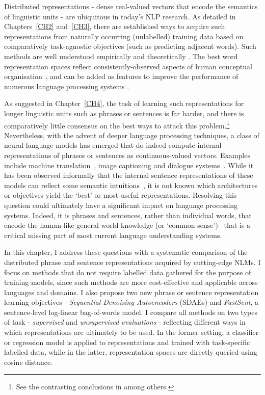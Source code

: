 \label{CH5}

Distributed representations - dense real-valued vectors that encode the semantics of linguistic units - are ubiquitous in today's NLP research. As detailed in Chapters~\ref{CH2} and~\ref{CH3}, there are established ways to acquire such representations from naturally occurring (unlabelled) training data based on comparatively task-agnostic objectives (such as predicting adjacent words). Such methods are well understood empirically \citep{baroni2014don} and theoretically \citep{levy2014neural}. The best word representation spaces reflect consistently-observed aspects of human conceptual organisation~\citep{hill2014simlex}, and can be added as features to improve the performance of numerous language processing systems \citep{collobert2011natural}. 

As suggested in Chapter~\ref{CH4}, the task of learning such representations for longer linguistic units such as phrases or sentences is far harder, and there is comparatively little consensus on the best ways to attack this problem.\footnote{See the contrasting conclusions in \citep{mitchell2008vector,clark2007combining,baroni2014frege,milajevs2014evaluating} among others.} Nevertheless, with the advent of deeper language processing techniques, a class of neural language models has emerged that do indeed compute internal representations of phrases or sentences as continuous-valued vectors. Examples include machine translation~\citep{Sutskever2014sequence}, image captioning \citep{mao2014deep} and dialogue systems~\citep{serban2015building}. While it has been observed informally that the internal sentence representations of these models can reflect some semantic intuitions~\citep{cho2014learning}, it is not known which architectures or objectives yield the `best' or most useful representations. Resolving this question could ultimately have a significant impact on language processing systems. Indeed, it is phrases and sentences, rather than individual words, that encode the human-like general world knowledge (or `common sense')~\citep{norman1972memory} that is a critical missing part of most current language understanding systems.

In this chapter, I address these questions with a systematic comparison of the distributed phrase and sentence representations acquired by cutting-edge NLMs. I focus on methods that do not require labelled data gathered for the purpose of training models, since such methods are more cost-effective and applicable across languages and domains. I also propose two new phrase or sentence representation learning objectives - \emph{Sequential Denoising Autoencoders} (SDAEs) and \emph{FastSent}, a sentence-level log-linear bag-of-words model. I compare all methods on two types of task - \emph{supervised} and \emph{unsupervised evaluations} - reflecting different ways in which representations are ultimately to be used. In the former setting, a classifier or regression model is applied to representations and trained with task-specific labelled data, while in the latter, representation spaces are directly queried using cosine distance.    

